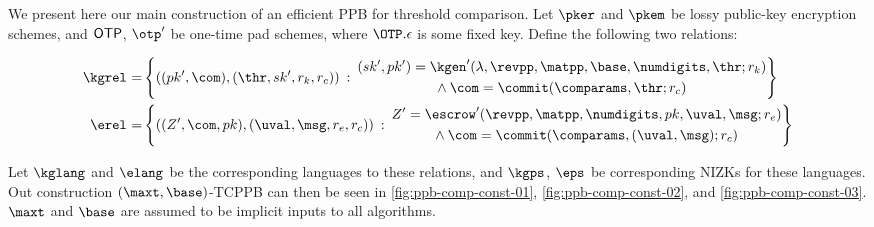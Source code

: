 We present here our main construction of an efficient PPB for threshold comparison.
Let $\pker$ and $\pkem$ be lossy public-key encryption schemes, and ${\sf OTP}$, $\otp'$ be one-time pad schemes, where $\OTP.\epsilon$ is some fixed key.
Define the following two relations:

\begin{align*}
	\kgrel^{} = & \left\{
	((pk', \com), (\thr, sk', r_k, r_c)) \::\:
	\begin{gathered}
		(sk', pk') = \kgen'(\lambda, \revpp, \matpp, \base, \numdigits, \thr; r_k) \\
		\wedge \: \com = \commit(\comparams, \thr; r_c)
	\end{gathered}
	\right\}              \\
	\erel^{} =  & \left\{
	((Z', \com, pk), (\uval, \msg, r_e, r_c)) \::\:
	\begin{gathered}
		Z' = \escrow'(\revpp, \matpp, \numdigits, pk, \uval, \msg; r_e) \\
		\wedge \: \com = \commit(\comparams, (\uval, \msg); r_c)
	\end{gathered}
	\right\}
\end{align*}

Let $\kglang^{}$ and $\elang^{}$ be the corresponding languages to these relations, and
$\kgps^{}$, $\eps^{}$ be corresponding NIZKs for these languages.
Out construction $(\maxt, \base)$-TCPPB can then be seen in \cref{fig:ppb-comp-const-01}, \cref{fig:ppb-comp-const-02}, and \cref{fig:ppb-comp-const-03}.
$\maxt$ and $\base$ are assumed to be implicit inputs to all algorithms.






